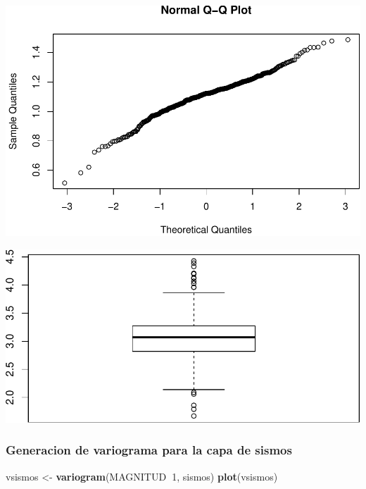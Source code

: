 \documentclass[11pt,]{article}
\newenvironment{Shaded}{\begin{snugshade}}{\end{snugshade}}
\newcommand{\KeywordTok}[1]{\textcolor[rgb]{0.13,0.29,0.53}{\textbf{#1}}}
\newcommand{\DecValTok}[1]{\textcolor[rgb]{0.00,0.00,0.81}{#1}}
\newcommand{\StringTok}[1]{\textcolor[rgb]{0.31,0.60,0.02}{#1}}
\newcommand{\OperatorTok}[1]{\textcolor[rgb]{0.81,0.36,0.00}{\textbf{#1}}}
\newcommand{\NormalTok}[1]{#1}
\begin{document}
\includegraphics{proyecto_files/figure-latex/unnamed-chunk-7-4.pdf}

\begin{Shaded}
\end{Shaded}

\includegraphics{proyecto_files/figure-latex/unnamed-chunk-7-5.pdf}

\subsubsection{Generacion de variograma para la capa de
sismos}\label{generacion-de-variograma-para-la-capa-de-sismos}

\begin{Shaded}
\begin{Highlighting}[]
\NormalTok{vsismos <-}\StringTok{ }\KeywordTok{variogram}\NormalTok{(MAGNITUD}\OperatorTok{~}\DecValTok{1}\NormalTok{, sismos)}
\KeywordTok{plot}\NormalTok{(vsismos)}
\end{Highlighting}
\end{Shaded}
\end{document}
